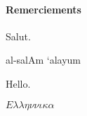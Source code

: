 \paragraph{Remerciements}
Salut.

\begin{arabtext}
al-salAm `alayum
\end{arabtext}

Hello.

$E\lambda\lambda\eta\nu\nu\iota\kappa\alpha$
